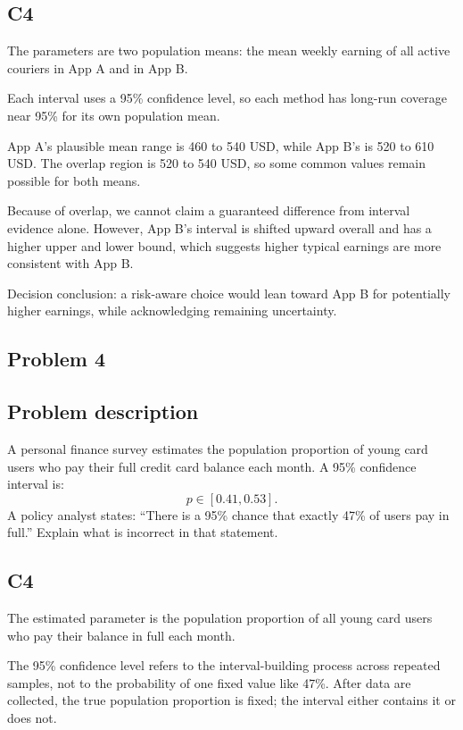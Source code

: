 \begin{ExamProblems}
		\subsection*{C4}
		The parameters are two population means: the mean weekly earning of all active couriers in App A and in App B.

		Each interval uses a 95\% confidence level, so each method has long-run coverage near 95\% for its own population mean.

		App A's plausible mean range is 460 to 540 USD, while App B's is 520 to 610 USD.
		The overlap region is 520 to 540 USD, so some common values remain possible for both means.

		Because of overlap, we cannot claim a guaranteed difference from interval evidence alone.
		However, App B's interval is shifted upward overall and has a higher upper and lower bound, which suggests higher typical earnings are more consistent with App B.

		Decision conclusion: a risk-aware choice would lean toward App B for potentially higher earnings, while acknowledging remaining uncertainty.

		\newpage
		\item
		\subsection*{Problem 4}
		\subsection*{Problem description}
		A personal finance survey estimates the population proportion of young card users who pay their full credit card balance each month.
		A 95\% confidence interval is:
		\[
		p \in [0.41, 0.53].
		\]
		A policy analyst states: ``There is a 95\% chance that exactly 47\% of users pay in full.''
		Explain what is incorrect in that statement.

		\subsection*{C4}
		The estimated parameter is the population proportion of all young card users who pay their balance in full each month.

		The 95\% confidence level refers to the interval-building process across repeated samples, not to the probability of one fixed value like 47\%.
		After data are collected, the true population proportion is fixed; the interval either contains it or does not.


\end{ExamProblems}
